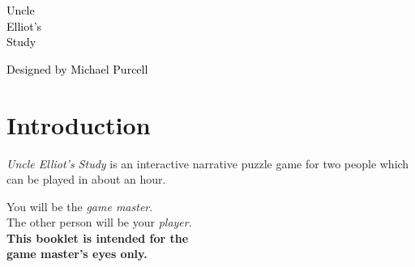 \documentclass[a6paper, parskip=half, DIV=14, 12pt]{scrartcl}
\begin{document}
{%
\thispagestyle{empty}
		\enlargethispage{3\baselineskip} %

\begin{center}
{
\setmainfont[Scale=2]{Special Elite}
\Huge
\textcolor{black}{Uncle\\[0.75ex]Elliot's\\[0.75ex]Study}
}
\end{center}

\vfill

\begin{center}
\end{center}

\vfill{}

\begin{center}
{
\setmainfont{Bilbo Swash Caps}
\LARGE
\textcolor{black}{Designed by Michael Purcell}
}
\end{center}
}

\newpage
\section*{Introduction}
\emph{Uncle Elliot's Study} is an interactive narrative puzzle game for two people which can be played in about an hour.

You will be the \emph{game master}.\\The other person will be your \emph{player}.\\\textbf{This booklet is intended for the\\game master's eyes only.}
\end{document}
